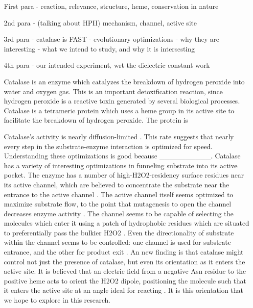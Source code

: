 \documentclass[journal=jacsat,manuscript=article]{achemso}
\begin{document}
First para
- reaction, relevance, structure, heme, conservation in nature

2nd para
- (talking about HPII) mechanism, channel, active site

3rd para
- catalase is FAST
- evolutionary optimizations
- why they are interesting
- what we intend to study, and why it is intersesting

4th para
- our intended experiment, wrt the dielectric constant work

Catalase is an enzyme which catalyzes the breakdown of hydrogen peroxide into water and oxygen gas. This is an important detoxification reaction, since hydrogen peroxide is a reactive toxin generated by several biological processes. Catalase is a tetrameric protein which uses a heme group in its active site to facilitate the breakdown of hydrogen peroxide. The protein is

Catalase's activity is nearly diffusion-limited \cite{kcatkm, difflimit}. This rate suggests that nearly every step in the substrate-enzyme interaction is optimized for speed. Understanding these optimizations is good because __________. Catalase has a variety of interesting optimizations in funneling substrate into its active pocket. The enzyme has a number of high-H2O2-residency surface residues near its active channel, which are believed to concentrate the substrate near the entrance to the active channel \cite{concentrateh2o2}. The active channel itself seems optimized to maximize substrate flow, to the point that mutagenesis to open the channel decreases enzyme activity \cite{substrateflow}. The channel seems to be capable of selecting the molecules which enter it using a patch of hydrophobic residues which are situated to preferentially pass the bulkier H2O2 \cite{molecularruler}. Even the directionality of substrate within the channel seems to be controlled: one channel is used for substrate entrance, and the other for product exit \cite{lateralchannel}. An new finding is that catalase might control not just the presence of catalase, but even its orientation as it enters the active site. It is believed that an electric field from a negative Asn residue to the positive heme acts to orient the H2O2 dipole, positioning the molecule such that it enters the active site at an angle ideal for reacting \cite{electricpotential}. It is this orientation that we hope to explore in this research.
\end{document}
